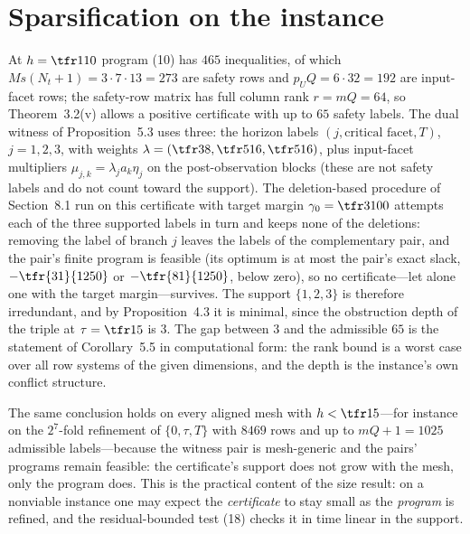 \section{Sparsification on the instance}\label{S:sparsification}

At $h=\tfr1{10}$ program (10) has $465$ inequalities, of which $Ms(N_t+1)=3\cdot7\cdot13=273$ are safety rows and $p_UQ=6\cdot32=192$ are input-facet rows; the safety-row matrix has full column rank $r=mQ=64$, so Theorem~3.2(v) allows a positive certificate with up to $65$ safety labels. The dual witness of Proposition~5.3 uses three: the horizon labels $(j,\text{critical facet},T)$, $j=1,2,3$, with weights $\lambda=(\tfr38,\tfr5{16},\tfr5{16})$, plus input-facet multipliers $\mu_{j,k}=\lambda_ja_k\eta_j$ on the post-observation blocks (these are not safety labels and do not count toward the support). The deletion-based procedure of Section~8.1 run on this certificate with target margin $\gamma_0=\tfr3{100}$ attempts each of the three supported labels in turn and keeps none of the deletions: removing the label of branch $j$ leaves the labels of the complementary pair, and the pair's finite program is feasible (its optimum is at most the pair's exact slack, $-\tfr{31}{1250}$ or $-\tfr{81}{1250}$, below zero), so no certificate---let alone one with the target margin---survives. The support $\{1,2,3\}$ is therefore irredundant, and by Proposition~4.3 it is minimal, since the obstruction depth of the triple at $\tau=\tfr15$ is $3$. The gap between $3$ and the admissible $65$ is the statement of Corollary~5.5 in computational form: the rank bound is a worst case over all row systems of the given dimensions, and the depth is the instance's own conflict structure.

The same conclusion holds on every aligned mesh with $h<\tfr15$---for instance on the $2^7$-fold refinement of $\{0,\tau,T\}$ with $8469$ rows and up to $mQ+1=1025$ admissible labels---because the witness pair is mesh-generic and the pairs' programs remain feasible: the certificate's support does not grow with the mesh, only the program does. This is the practical content of the size result: on a nonviable instance one may expect the \emph{certificate} to stay small as the \emph{program} is refined, and the residual-bounded test (18) checks it in time linear in the support.
